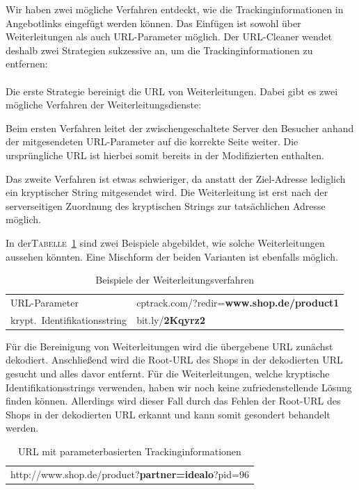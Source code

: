 Wir haben zwei mögliche Verfahren entdeckt, wie die Trackinginformationen in Angebotlinks eingefügt werden können.
Das Einfügen ist sowohl über Weiterleitungen als auch URL-Parameter möglich.
Der URL-Cleaner wendet deshalb zwei Strategien sukzessive an, um die Trackinginformationen zu entfernen:
\\
~\\
Die erste Strategie bereinigt die URL von Weiterleitungen.
Dabei gibt es zwei mögliche Verfahren der Weiterleitungsdienste:

Beim ersten Verfahren leitet der zwischengeschaltete Server den Besucher anhand der mitgesendeten URL-Parameter auf
die korrekte Seite weiter.
Die ursprüngliche URL ist hierbei somit bereits in der Modifizierten enthalten.

Das zweite Verfahren ist etwas schwieriger, da anstatt der Ziel-Adresse lediglich ein kryptischer String mitgesendet
wird.
Die Weiterleitung ist erst nach der serverseitigen Zuordnung des kryptischen Strings zur tatsächlichen Adresse möglich.

In der\textsc{Tabelle}~\ref{tab:redirect} sind zwei Beispiele abgebildet, wie solche Weiterleitungen aussehen könnten.
Eine Mischform der beiden Varianten ist ebenfalls möglich.

\begin{table}[h]
    \centering
    \begin{tabular}{ l | l }
        URL-Parameter                 &   cptrack.com/?redir=\textbf{www.shop.de/product1}\\
        krypt.\ Identifikationsstring   &   bit.ly/\textbf{2Kqyrz2}
    \end{tabular}
    \caption{Beispiele der Weiterleitungsverfahren}
    \label{tab:redirect}
\end{table}
\vspace{-0.25cm}

Für die Bereinigung von Weiterleitungen wird die übergebene URL zunächst dekodiert.
Anschließend wird die Root-URL des Shops in der dekodierten URL gesucht und alles davor entfernt.
Für die Weiterleitungen, welche kryptische Identifikationsstrings verwenden, haben wir noch keine zufriedenstellende
Lösung finden können.
Allerdings wird dieser Fall durch das Fehlen der Root-URL des Shops in der dekodierten URL erkannt und kann somit
gesondert behandelt werden.

\begin{table}[h]
    \centering
    \begin{tabular}{ c }
        http://www.shop.de/product?\textbf{partner=idealo}?pid=96
    \end{tabular}
    \caption{URL mit parameterbasierten Trackinginformationen}
    \label{tab:trackparameter}
\end{table}
\vspace{-0.25cm}

